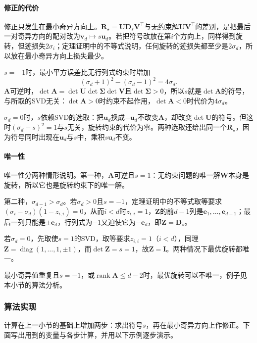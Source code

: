 \paragraph{修正的代价}
修正只发生在最小奇异方向上。$\bm R_\star=\bm U\bm D_s\bm V^\top$与无约束解$\bm U\bm V^\top$的差别，是把最后一对奇异方向的配对改为$\bm v_d\mapsto s\bm u_d$。若把符号改放在第$i$个方向上，同样得到旋转，但迹损失$2\sigma_i$；定理证明中的不等式说明，任何旋转的迹损失都至少是$2\sigma_d$，所以放在最小奇异方向上损失最少。

$s=-1$时，最小平方误差比无行列式约束时增加
\begin{equation}
 (\sigma_d+1)^2-(\sigma_d-1)^2=4\sigma_d .
 \label{eq:matrix-approximation-rotation-cost}
\end{equation}
$\bm A$可逆时，$\det\bm A=\det\bm U\det\bm\Sigma\det\bm V$且$\det\bm\Sigma>0$，所以$s$就是$\det\bm A$的符号，与所取的SVD无关：$\det\bm A>0$时约束不起作用，$\det\bm A<0$时代价为$4\sigma_d$。

$\sigma_d=0$时，$s$依赖SVD的选取：把$\bm u_d$换成$-\bm u_d$不改变$\bm A$，却改变$\det\bm U$的符号。但这时$(\sigma_d-s)^2=1$与$s$无关，旋转约束的代价为零。两种选取还给出同一个$\bm R_\star$，因为符号同时出现在$\bm u_d$与$s$中，乘积$s\bm u_d$不变。

\paragraph{唯一性}
唯一性分两种情形说明。第一种，$\bm A$可逆且$s=1$：无约束问题的唯一解$\bm W$本身是旋转，所以它也是旋转约束下的唯一解。

第二种，$\sigma_{d-1}>\sigma_d$。若$\sigma_d>0$且$s=-1$，定理证明中的不等式取等要求$(\sigma_i-\sigma_d)(1-z_{i,i})=0$，从而$i<d$时$z_{i,i}=1$，$\bm Z$的前$d-1$列是$\bm e_1,\ldots,\bm e_{d-1}$；最后一列只能是$\pm\bm e_d$，行列式为$-1$又迫使它为$-\bm e_d$，即$\bm Z=\bm D_s$。

若$\sigma_d=0$，先取使$s=1$的SVD，取等要求$z_{i,i}=1$（$i<d$），同理$\bm Z=\operatorname{diag}(1,\ldots,1,\pm1)$，而$\det\bm Z=s=1$，故$\bm Z=\bm I$。两种情况下最优旋转都唯一。

最小奇异值重复且$s=-1$，或$\operatorname{rank}\bm A\leq d-2$时，最优旋转可以不唯一，例子见本小节的算法分析。

\subsubsection{算法实现}

计算在上一小节的基础上增加两步：求出符号$s$，再在最小奇异方向上作修正。下面写出用到的变量与各步计算，并用以下示例逐步演示。

